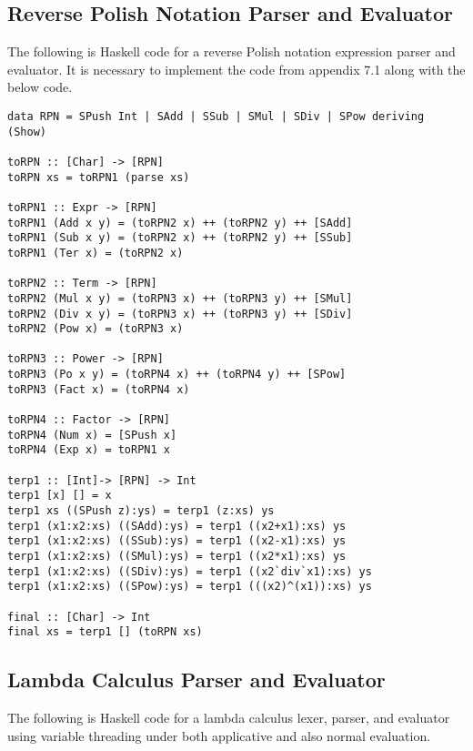 \documentclass[11pt]{article}
\begin{document}
\subsection{Reverse Polish Notation Parser and Evaluator}

The following is Haskell code for a reverse Polish notation expression parser and evaluator. It is necessary to implement the code from appendix 7.1 along with the below code.

\begin{verbatim}
data RPN = SPush Int | SAdd | SSub | SMul | SDiv | SPow deriving (Show)

toRPN :: [Char] -> [RPN]
toRPN xs = toRPN1 (parse xs)

toRPN1 :: Expr -> [RPN]
toRPN1 (Add x y) = (toRPN2 x) ++ (toRPN2 y) ++ [SAdd]
toRPN1 (Sub x y) = (toRPN2 x) ++ (toRPN2 y) ++ [SSub]
toRPN1 (Ter x) = (toRPN2 x)

toRPN2 :: Term -> [RPN]
toRPN2 (Mul x y) = (toRPN3 x) ++ (toRPN3 y) ++ [SMul]
toRPN2 (Div x y) = (toRPN3 x) ++ (toRPN3 y) ++ [SDiv]
toRPN2 (Pow x) = (toRPN3 x)

toRPN3 :: Power -> [RPN]
toRPN3 (Po x y) = (toRPN4 x) ++ (toRPN4 y) ++ [SPow]
toRPN3 (Fact x) = (toRPN4 x)

toRPN4 :: Factor -> [RPN]
toRPN4 (Num x) = [SPush x]
toRPN4 (Exp x) = toRPN1 x

terp1 :: [Int]-> [RPN] -> Int
terp1 [x] [] = x
terp1 xs ((SPush z):ys) = terp1 (z:xs) ys
terp1 (x1:x2:xs) ((SAdd):ys) = terp1 ((x2+x1):xs) ys
terp1 (x1:x2:xs) ((SSub):ys) = terp1 ((x2-x1):xs) ys
terp1 (x1:x2:xs) ((SMul):ys) = terp1 ((x2*x1):xs) ys
terp1 (x1:x2:xs) ((SDiv):ys) = terp1 ((x2`div`x1):xs) ys
terp1 (x1:x2:xs) ((SPow):ys) = terp1 (((x2)^(x1)):xs) ys

final :: [Char] -> Int
final xs = terp1 [] (toRPN xs)
\end{verbatim}

\subsection{Lambda Calculus Parser and Evaluator}

The following is Haskell code for a lambda calculus lexer, parser, and evaluator using variable threading under both applicative and also normal evaluation. 
\end{document}
